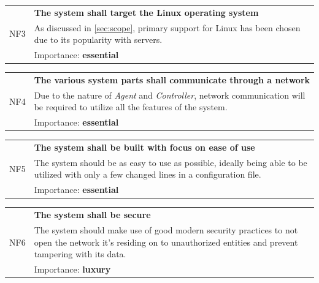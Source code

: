 \documentclass[12pt,a4paper,table]{article}
\begin{document}
            \vspace{0.5cm}
            \noindent
            \begin{tabular}{ p{0.7cm}|p{14.5cm} }
                \multirow{3}{*}{NF3} & \textbf{The system shall target the Linux operating system}\\
                \cline{2-2}
                & As discussed in \autoref{sec:scope}, primary support for Linux has been chosen due to its popularity with servers.\\
                \cline{2-2}
                & Importance: \textbf{essential}
            \end{tabular}

            \vspace{0.5cm}
            \noindent
            \begin{tabular}{ p{0.7cm}|p{14.5cm} }
                \multirow{3}{*}{NF4} & \textbf{The various system parts shall communicate through a network}\\
                \cline{2-2}
                & Due to the nature of \textit{Agent} and \textit{Controller}, network communication will be required to utilize all the features of the system.\\
                \cline{2-2}
                & Importance: \textbf{essential}
            \end{tabular}

            \vspace{0.5cm}
            \noindent
            \begin{tabular}{ p{0.7cm}|p{14.5cm} }
                \multirow{3}{*}{NF5} & \textbf{The system shall be built with focus on ease of use}\\
                \cline{2-2}
                & The system should be as easy to use as possible, ideally being able to be utilized with only a few changed lines in a configuration file.\\
                \cline{2-2}
                & Importance: \textbf{essential}
            \end{tabular}

            \vspace{0.5cm}
            \noindent
            \begin{tabular}{ p{0.7cm}|p{14.5cm} }
                \multirow{3}{*}{NF6} & \textbf{The system shall be secure}\\
                \cline{2-2}
                & The system should make use of good modern security practices to not open the network it's residing on to unauthorized entities and prevent tampering with its data.\\
                \cline{2-2}
                & Importance: \textbf{luxury}
            \end{tabular}
\end{document}
